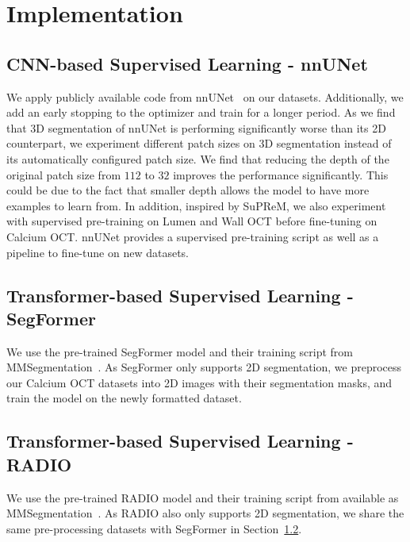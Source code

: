 \documentclass[a4paper,11pt,oneside]{report}
\begin{document}
\chapter{Implementation}


\section{CNN-based Supervised Learning - nnUNet}
We apply publicly available code from nnUNet~\cite{Isensee2020} on our datasets. Additionally, we add an early stopping to the optimizer and train for a longer period. As we find that 3D segmentation of nnUNet is performing significantly worse than its 2D counterpart, we experiment different patch sizes on 3D segmentation instead of its automatically configured patch size. We find that reducing the depth of the original patch size from $112$ to $32$ improves the performance significantly. This could be due to the fact that smaller depth allows the model to have more examples to learn from. In addition, inspired by SuPReM, we also experiment with supervised pre-training on Lumen and Wall OCT before fine-tuning on Calcium OCT. nnUNet provides a supervised pre-training script as well as a pipeline to fine-tune on new datasets.

\section{Transformer-based Supervised Learning - SegFormer}\label{sec:implementation:segformer}
We use the pre-trained SegFormer model and their training script from MMSegmentation~\cite{mmseg2020}. As SegFormer only supports 2D segmentation, we preprocess our Calcium OCT datasets into 2D images with their segmentation masks, and train the model on the newly formatted dataset.

\section{Transformer-based Supervised Learning - RADIO}
We use the pre-trained RADIO model and their training script from available as MMSegmentation~\cite{mmseg2020}. As RADIO also only supports 2D segmentation, we share the same pre-processing datasets with SegFormer in Section~\ref{sec:implementation:segformer}.
\end{document}
